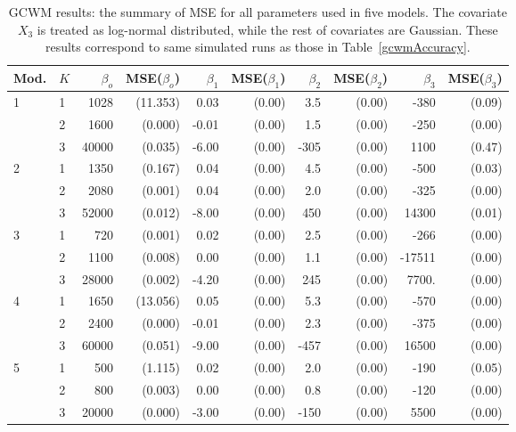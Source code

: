 \documentclass[12pt,letterpaper]{article}
\numberwithin{equation}{section}
\numberwithin{equation}{section}
\numberwithin{equation}{section}
\begin{document}
\begin{table}[h!]
\centering
\caption{ GCWM results: the summary of MSE for all parameters used in five models. The covariate $X_3$ is treated as log-normal distributed, while the rest of covariates are Gaussian. These results correspond to same simulated runs as those in Table~\ref{gcwmAccuracy}.}
\label{mseTable}
\begin{tabular}{ll|rrrrrrrr}
\hline
Mod. & $K$ & $\beta_o$ &  MSE($\beta_o$)   &  $\beta_1$ & MSE($\beta_1$)& $\beta_2$ &MSE($\beta_2$)   & $\beta_3$ &  MSE($\beta_3$)  \\
\hline
1     & 1         & 1028& (11.353)   & 0.03& (0.00)  & 3.5& (0.00)    & -380& (0.09)   \\
      & 2         & 1600& (0.000)     & -0.01&(0.00) & 1.5&(0.00)    & -250&(0.00)   \\
      & 3         & 40000&(0.035)    & -6.00&(0.00) & -305&(0.00) & 1100&(0.47)   \\
\hline
2     & 1         & 1350&(0.167)     & 0.04&(0.00)  & 4.5&(0.00)    & -500&(0.03)   \\
      & 2         & 2080& (0.001)     & 0.04&(0.00)  & 2.0&(0.00)    & -325&(0.00)   \\
      & 3         & 52000& (0.012)    & -8.00&(0.00) & 450&(0.00)  & 14300&(0.01)  \\
\hline
3     & 1         & 720& (0.001)      & 0.02&(0.00)  & 2.5&(0.00)   & -266&(0.00)   \\
      & 2         & 1100& (0.008)     & 0.00&(0.00)  & 1.1&(0.00)    & -17511&(0.00) \\
      & 3         & 28000& (0.002)    & -4.20&(0.00) & 245&(0.00)  & 7700.&(0.00) \\
\hline
4     & 1         & 1650&(13.056)   & 0.05&(0.00)  & 5.3&(0.00)    & -570&(0.00)   \\
      & 2         & 2400& (0.000)     & -0.01&(0.00) & 2.3&(0.00)    & -375&(0.00)   \\
      & 3         & 60000& (0.051)    & -9.00&(0.00) & -457&(0.00) & 16500&(0.00)  \\
\hline
5     & 1         & 500& (1.115)     & 0.02&(0.00)  & 2.0&(0.00)    & -190&(0.05)   \\
      & 2         & 800& (0.003)      & 0.00&(0.00)  & 0.8&(0.00)    & -120&(0.00)   \\
      & 3         & 20000& (0.000)    & -3.00&(0.00) & -150&(0.00) & 5500&(0.00)  \\
      \hline
\end{tabular}
\end{table}
\end{document}
